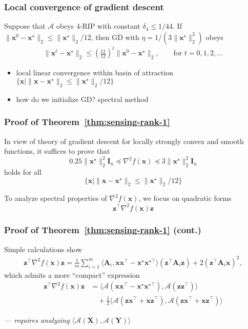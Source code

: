 \documentclass[compress,
mathserif,wide,%
]{beamer}
\begin{document}
\begin{frame}
	\frametitle{Local convergence of gradient descent}
	
	\begin{theorem}\label{thm:sensing-rank-1}
		Suppose that $\mathcal{A}$ obeys 4-RIP with constant $\delta_{4} \leq 1 /44$. If $\| \bm{x}^0 - \bm{x}^\star \|_{2} \leq \|\bm{x}^\star\|_{2} / 12$, then GD with $\eta = 1 / (3 \|\bm{x}^\star\|_{2}^{2})$ obeys
		\begin{align*}
			\| \bm{x}^t - \bm{x}^\star \|_2 \leq (\tfrac{11}{12})^t \| \bm{x}^0 - \bm{x}^\star \|_2, \qquad \text{for }t=0,1,2,\ldots
		\end{align*}
	\end{theorem}

	\vfill
	\begin{itemize}
		\item local linear convergence within basin of attraction $\{\bm{x} \mid \| \bm{x} - \bm{x}^\star \|_{2} \leq \|\bm{x}^\star\|_{2} / 12\}$
		\item how do we initialize GD? spectral method
	\end{itemize}
\end{frame}

\begin{frame}
	\frametitle{Proof of Theorem~\ref{thm:sensing-rank-1}}
	In view of theory of gradient descent for locally strongly convex and smooth functions, it suffices to prove that 
	\[
		0.25 \|\bm{x}^\star\|_{2}^{2} \bm{I}_{n} \preceq \nabla^2 f (\bm{x}) \preceq 3 \|\bm{x}^\star\|_{2}^{2} \bm{I}_{n}
	\]
	holds for all 
	\[
	\{\bm{x} \mid \| \bm{x} - \bm{x}^\star \|_{2} \leq \|\bm{x}^\star\|_{2} / 12\}
	\]

	To analyze spectral properties of $\nabla^2 f (\bm{x})$, we focus on quadratic forms
	\[
	\bm{z}^\top  \nabla^2 f (\bm{x}) \bm{z} 
	\]
\end{frame}

\begin{frame}
	\frametitle{Proof of Theorem~\ref{thm:sensing-rank-1} (cont.)}
	Simple calculations show
	\begin{align*}
		\bm{z}^\top  \nabla^2 f (\bm{x}) \bm{z} = \frac{1}{m} \sum_{i=1}^{m} \langle \bm{A}_{i}, \bm{x} \bm{x}^\top  - \bm{x}^{\star} \bm{x}^{\star \top} \rangle (\bm{z}^\top  \bm{A}_{i} \bm{z} ) + 2 (\bm{z}^\top  \bm{A}_{i} \bm{x} )^2,
	\end{align*}
	which admits a more ``compact'' expression
	\begin{align*}
		\bm{z}^\top  \nabla^2 f (\bm{x}) \bm{z} &= \langle \mathcal{A} (\bm{x} \bm{x}^\top  - \bm{x}^{\star} \bm{x}^{\star \top}), \mathcal{A} (\bm{z} \bm{z}^\top ) \rangle \\
		&\quad + \frac{1}{2} \langle \mathcal{A} (\bm{z} \bm{x}^\top  + \bm{x} \bm{z}^{\top}), \mathcal{A} (\bm{z} \bm{x}^\top  + \bm{x} \bm{z}^{\top}) \rangle 
	\end{align*}
	
	\vfill
	{\em \hfill --- requires analyzing $\langle \mathcal{A}(\bm{X}), \mathcal{A}(\bm{Y}) \rangle$}
\end{frame}
\end{document}
